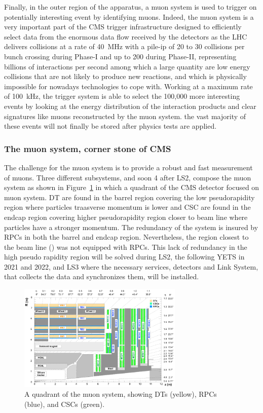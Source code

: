 	Finally, in the outer region of the apparatus, a muon system is used to trigger on potentially interesting event by identifying muons. Indeed, the muon system is a very important part of the CMS trigger infrastructure designed to efficiently select data from the enormous data flow received by the detectors as the LHC delivers collisions at a rate of \SI{40}{MHz} with a pile-ip of 20 to 30 collisions per bunch crossing during Phase-I and up to 200 during Phase-II, representing billions of interactions per second among which a large quantity are low energy collisions that are not likely to produce new reactions, and which is physically impossible for nowadays technologies to cope with. Working at a maximum rate of \SI{100}{kHz}, the trigger system is able to select the 100,000 more interesting events by looking at the energy distribution of the interaction products and clear signatures like muons reconstructed by the muon system. the vast majority of these events will not finally be stored after physics tests are applied.
	
		\subsubsection{The muon system, corner stone of CMS}
		\label{chapt2:sssec:muon}
	
	The challenge for the muon system is to provide a robust and fast measurement of muons. Three different subsystems, and soon 4 after LS2, compose the muon system as shown in Figure~\ref{fig:Quadrant} in which a quadrant of the CMS detector focused on muon system. \acf{DT} are found in the barrel region covering the low pseudorapidity region where particles traasverse momentum is lower and \acf{CSC} are found in the endcap region covering higher pseudorapidity region closer to beam line where particles have a stronger momentum. The redundancy of the system is insured by \acl{RPC}s in both the barrel and endcap region. Nevertheless, the region closest to the beam line () was not equipped with RPCs. This lack of redundancy in the high pseudo rapidity region will be solved during LS2, the following \acf{YETS} in 2021 and 2022, and LS3 where the necessary services, detectors and Link System, that collects the data and synchronizes them, will be installed.

	\begin{figure}[H]
		\centering
		\includegraphics[width=0.7\textwidth]{fig/chapt2/Muon_quadrant.png}
		\caption{\label{fig:Quadrant} A quadrant of the muon system, showing DTs (yellow), RPCs (blue), and CSCs (green).}
	\end{figure}

